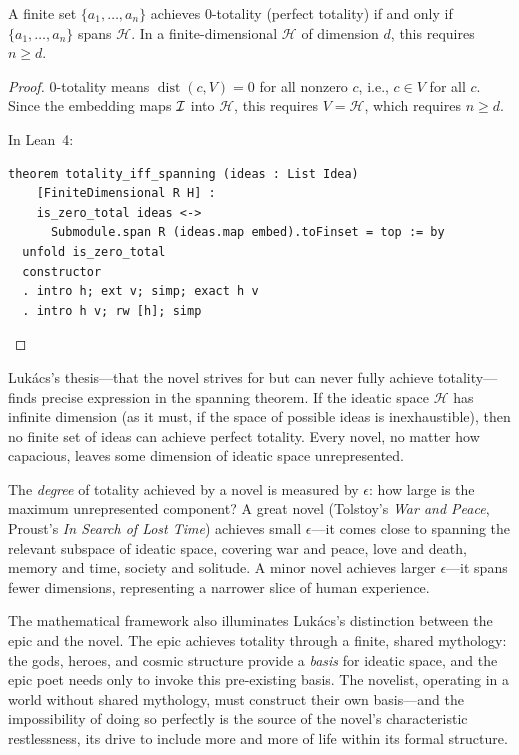 \begin{theorem}
\label{thm:totality-spanning}
A finite set $\{a_1, \ldots, a_n\}$ achieves $0$-totality (perfect totality)
if and only if $\{a_1, \ldots, a_n\}$ spans $\mathcal{H}$.
In a finite-dimensional $\mathcal{H}$ of dimension $d$, this requires $n \geq d$.
\end{theorem}

\begin{proof}
$0$-totality means $\operatorname{dist}(c, V) = 0$ for all nonzero
$c$, i.e., $c \in V$ for all $c$.  Since the embedding maps $\mathcal{I}$ into
$\mathcal{H}$, this requires $V = \mathcal{H}$, which requires $n \geq d$.

In Lean~4:
\begin{lstlisting}
theorem totality_iff_spanning (ideas : List Idea)
    [FiniteDimensional R H] :
    is_zero_total ideas <->
      Submodule.span R (ideas.map embed).toFinset = top := by
  unfold is_zero_total
  constructor
  . intro h; ext v; simp; exact h v
  . intro h v; rw [h]; simp
\end{lstlisting}
\end{proof}

\begin{interpretation}
\label{interp:totality}
Luk\'acs's thesis---that the novel strives for but can never fully achieve
totality---finds precise expression in the spanning theorem.  If the ideatic
space $\mathcal{H}$ has infinite dimension (as it must, if the space of possible
ideas is inexhaustible), then no finite set of ideas can achieve perfect
totality.  Every novel, no matter how capacious, leaves some dimension of
ideatic space unrepresented.

The \emph{degree} of totality achieved by a novel is measured by $\epsilon$:
how large is the maximum unrepresented component?  A great novel (Tolstoy's
\emph{War and Peace}, Proust's \emph{In Search of Lost Time}) achieves small
$\epsilon$---it comes close to spanning the relevant subspace of ideatic space,
covering war and peace, love and death, memory and time, society and solitude.
A minor novel achieves larger $\epsilon$---it spans fewer dimensions,
representing a narrower slice of human experience.

The mathematical framework also illuminates Luk\'acs's distinction between the
epic and the novel.  The epic achieves totality through a finite, shared
mythology: the gods, heroes, and cosmic structure provide a \emph{basis} for
ideatic space, and the epic poet needs only to invoke this pre-existing basis.
The novelist, operating in a world without shared mythology, must construct
their own basis---and the impossibility of doing so perfectly is the source
of the novel's characteristic restlessness, its drive to include more and
more of life within its formal structure.
\end{interpretation}

